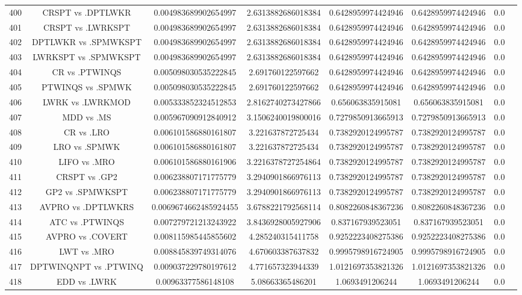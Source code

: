 \documentclass[a3paper,10pt]{article}
\begin{document}
\begin{table}[!htp]
\begin{tabular}{cccccccc}
400&CRSPT vs .DPTLWKR&0.004983689902654997&2.6313882686018384&0.6428959974424946&0.6428959974424946&0.0\\
401&CRSPT vs .LWRKSPT&0.004983689902654997&2.6313882686018384&0.6428959974424946&0.6428959974424946&0.0\\
402&DPTLWKR vs .SPMWKSPT&0.004983689902654997&2.6313882686018384&0.6428959974424946&0.6428959974424946&0.0\\
403&LWRKSPT vs .SPMWKSPT&0.004983689902654997&2.6313882686018384&0.6428959974424946&0.6428959974424946&0.0\\
404&CR vs .PTWINQS&0.005098030535222845&2.691760122597662&0.6428959974424946&0.6428959974424946&0.0\\
405&PTWINQS vs .SPMWK&0.005098030535222845&2.691760122597662&0.6428959974424946&0.6428959974424946&0.0\\
406&LWRK vs .LWRKMOD&0.005333852324512853&2.8162740273427866&0.656063835915081&0.656063835915081&0.0\\
407&MDD vs .MS&0.005967090912840912&3.1506240019800016&0.7279850913665913&0.7279850913665913&0.0\\
408&CR vs .LRO&0.006101586880161807&3.221637872725434&0.7382920124995787&0.7382920124995787&0.0\\
409&LRO vs .SPMWK&0.006101586880161807&3.221637872725434&0.7382920124995787&0.7382920124995787&0.0\\
410&LIFO vs .MRO&0.006101586880161906&3.2216378727254864&0.7382920124995787&0.7382920124995787&0.0\\
411&CRSPT vs .GP2&0.006238807171775779&3.2940901866976113&0.7382920124995787&0.7382920124995787&0.0\\
412&GP2 vs .SPMWKSPT&0.006238807171775779&3.2940901866976113&0.7382920124995787&0.7382920124995787&0.0\\
413&AVPRO vs .DPTLWKRS&0.0069674662485924455&3.6788221792568114&0.8082260848367236&0.8082260848367236&0.0\\
414&ATC vs .PTWINQS&0.007279721213243922&3.8436928005927906&0.837167939523051&0.837167939523051&0.0\\
415&AVPRO vs .COVERT&0.008115985445855602&4.285240315411758&0.9252223408275386&0.9252223408275386&0.0\\
416&LWT vs .MRO&0.008845839749314076&4.670603387637832&0.9995798916724905&0.9995798916724905&0.0\\
417&DPTWINQNPT vs .PTWINQ&0.009037229780197612&4.771657323944339&1.0121697353821326&1.0121697353821326&0.0\\
418&EDD vs .LWRK&0.00963377586148108&5.08663365486201&1.0693491206244&1.0693491206244&0.0\\

\end{tabular}
\end{table}
\end{document}
